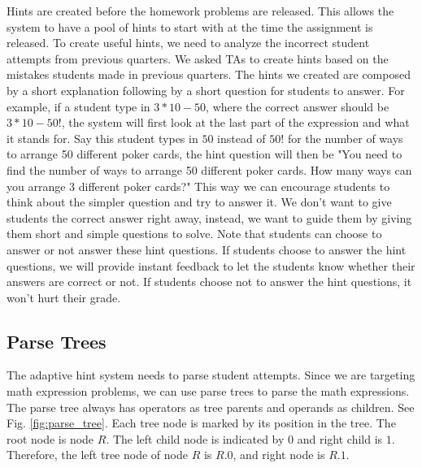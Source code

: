 \documentclass{article} %
\begin{document}
Hints are created before the homework problems are released. This allows the system to have a pool of hints to start with at the time the assignment is released. To create useful hints, we need to analyze the incorrect student attempts from previous quarters. We asked TAs to create hints based on the mistakes students made in previous quarters. The hints we created are composed by a short explanation following by a short question for students to answer. For example, if a student type in $3*10-50$, where the correct answer should be $3*10-50!$, the system will first look at the last part of the expression and what it stands for. Say this student types in $50$ instead of $50!$ for the number of ways to arrange 50 different poker cards, the hint question will then be "You need to find the number of ways to arrange 50 different poker cards. How many ways can you arrange 3 different poker cards?" This way we can encourage students to think about the simpler question and try to answer it. We don't want to give students the correct answer right away, instead, we want to guide them by giving them short and simple questions to solve. Note that students can choose to answer or not answer these hint questions. If students choose to answer the hint questions, we will provide instant feedback to let the students know whether their answers are correct or not. If students choose not to answer the hint questions, it won't hurt their grade.

\subsection*{Parse Trees}
The adaptive hint system needs to parse student attempts. Since we are targeting math expression problems, we can use parse trees to parse the math expressions. The parse tree always has operators as tree parents and operands as children. See Fig. \ref{fig:parse_tree}. Each tree node is marked by its position in the tree. The root node is node $R$. The left child node is indicated by $0$ and right child is $1$. Therefore, the left tree node of node $R$ is $R.0$, and right node is $R.1$. 
\end{document}
